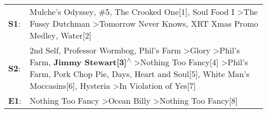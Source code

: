 \begin{supertabular}{p{0.03\textwidth}p{0.92\textwidth}}
 \textbf{S1}:  &                                                                                                                                                                                                                                                                                                                Mulche's Odyssey\textsuperscript{}, \enspace \#5\textsuperscript{}, \enspace The Crooked One[1]\textsuperscript{}, \enspace Soul Food I\textsuperscript{} \textgreater \enspace The Fussy Dutchman\textsuperscript{} \textgreater \enspace Tomorrow Never Knows\textsuperscript{}, \enspace XRT Xmas Promo Medley\textsuperscript{}, \enspace Water[2]\textsuperscript{}  \enspace  \\
 \textbf{S2}:  &  2nd Self\textsuperscript{}, \enspace Professor Wormbog\textsuperscript{}, \enspace Phil's Farm\textsuperscript{} \textgreater \enspace Glory\textsuperscript{} \textgreater \enspace Phil's Farm\textsuperscript{}, \enspace \textbf{Jimmy Stewart[3]\textsuperscript{$\wedge$}} \textgreater \enspace Nothing Too Fancy[4]\textsuperscript{} \textgreater \enspace Phil's Farm\textsuperscript{}, \enspace Pork Chop Pie\textsuperscript{},  Days\textsuperscript{}, \enspace Heart and Soul[5]\textsuperscript{}, \enspace White Man's Moccasins[6]\textsuperscript{}, \enspace Hysteria\textsuperscript{} \textgreater \enspace In Violation of Yes[7]\textsuperscript{}  \enspace  \\
 \textbf{E1}:  &                                                                                                                                                                                                                                                                                                                                                                                                                                                                                                                                    Nothing Too Fancy\textsuperscript{} \textgreater \enspace Ocean Billy\textsuperscript{} \textgreater \enspace Nothing Too Fancy[8]\textsuperscript{}  \enspace  \\
\end{supertabular}
